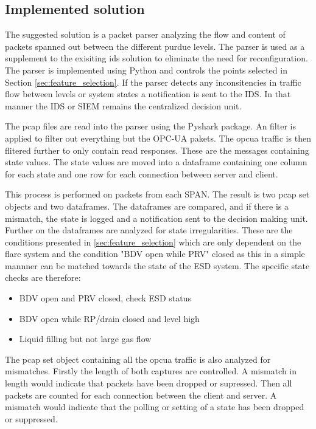 \subsection{Implemented solution}

The suggested solution is a packet parser analyzing the flow and content of packets
spanned out between the different purdue levels. The parser is used as a supplement
to the exisiting ids solution to eliminate the need for reconfiguration. 
The parser is implemented using Python and controls the points selected in Section \ref{sec:feature_selection}.
If the parser detects any inconsitencies in traffic flow between levels or system states 
a notification is sent to the IDS. In that manner the IDS or SIEM remains the centralized 
decision unit.

The pcap files are read into the parser using the Pyshark package. An filter is
applied to filter out everything but the OPC-UA pakets. The opcua traffic is then 
flitered further to only contain read responses. These are the messages containing 
state values. The state values are moved into a dataframe containing one column 
for each state and one row for each connection between server and client. 

This process is performed on packets from each SPAN. The result is two pcap set objects and
two dataframes. The dataframes are compared, and if there is a mismatch, the state is
logged and a notification sent to the decision making unit. Further on the dataframes
are analyzed for state irregularities. These are the conditions presented in \ref{sec:feature_selection} which are 
only dependent on the flare system and the condition "BDV open while PRV" closed as this in
a simple mannner can be matched towards the state of the ESD system. The specific
state checks are therefore:

\begin{itemize}
 \item BDV open and PRV closed, check ESD status
 \item BDV open while RP/drain closed and level high
 \item Liquid filling but not large gas flow
\end{itemize}

The pcap set object containing all the opcua traffic is also analyzed for 
mismatches. Firstly the length of both captures are controlled. A mismatch
in length would indicate that packets have been dropped or supressed. Then all packets are
counted for each connection between the client and server. A mismatch would indicate that
the polling or setting of a state has been dropped or suppressed. 

